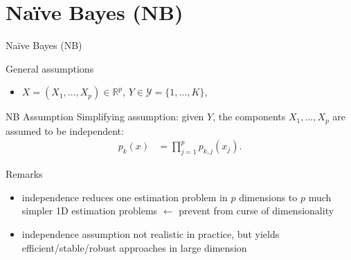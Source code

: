 \documentclass[compress, smaller, serif, 9pt]{beamer}
\newcommand{\structuretext}[1]{{\usebeamercolor[fg]{structure} #1}}
\begin{document}
\section{Naïve Bayes (NB)}

\begin{frame}{Naïve Bayes (NB)}

\begin{block}{General assumptions}
 \begin{itemize}
  \item $X=(X_1,\ldots,X_p) \in \mathbb{R}^p$, $Y \in \mathcal{Y}=\{1,\ldots,K\}$,
 \end{itemize}
\end{block}


\begin{block}{NB Assumption}
Simplifying assumption: given $Y$, the components $X_1,\ldots,X_p$ are assumed to be \structuretext{independent}:
\begin{align*}
   p_k(x) &= \prod_{j=1}^p p_{k,j}(x_j).
\end{align*} \vspace{-5mm}
\end{block}

\begin{block}{Remarks}
    \begin{itemize}
       \item independence reduces one estimation problem in $p$ dimensions to $p$  much simpler 1D estimation problems   $\leftarrow$ prevent from curse of dimensionality
       \item independence assumption not realistic in practice, but yields efficient/stable/robust approaches in large dimension
    \end{itemize}

\end{block}

\end{frame}
\end{document}
